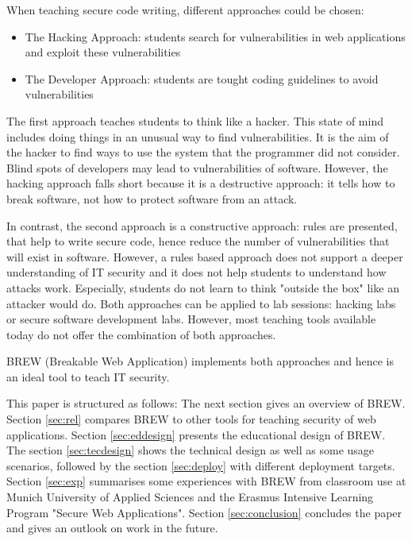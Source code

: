 \documentclass{llncs}
\begin{document}
When teaching secure code writing, different approaches could be chosen:
\begin{itemize}
\item The Hacking Approach: students search for vulnerabilities in web applications and exploit these vulnerabilities
\item The Developer Approach: students are tought coding guidelines to avoid vulnerabilities
\end{itemize}
The first approach teaches students to think like a hacker.
This state of mind includes doing things in an unusual way to find vulnerabilities. It is the aim of the hacker to find ways to use the system that the programmer did not consider. Blind spots of developers may lead to vulnerabilities of software.
However, the hacking approach falls short because it is a destructive approach: it tells how to break software, not how to protect software from an attack.

In contrast, the second approach is a constructive approach: rules are presented, that help to write secure code, hence reduce the number of vulnerabilities that will exist in software.
However, a rules based approach does not support a deeper understanding of IT security and it does not help students to understand how attacks work.
Especially, students do not learn to think "outside the box" like an attacker would do.
Both approaches can be applied to lab sessions: hacking labs or secure software development labs.
However, most teaching tools available today do not offer the combination of both approaches. 

BREW (Breakable Web Application) implements both approaches and hence is an ideal tool to teach IT security.

This paper is structured as follows: The next section gives an overview of BREW.
Section \ref{sec:rel} compares BREW to other tools for teaching security of web applications.
Section \ref{sec:eddesign} presents the educational design of BREW.
The section \ref{sec:tecdesign} shows the technical design as well as some usage scenarios, followed by the section \ref{sec:deploy} with different deployment targets.
Section \ref{sec:exp} summarises some experiences with BREW from classroom use at Munich University of Applied Sciences and the Erasmus Intensive Learning Program "Secure Web Applications".
Section \ref{sec:conclusion} concludes the paper and gives an outlook on work in the future.
 
\end{document}
